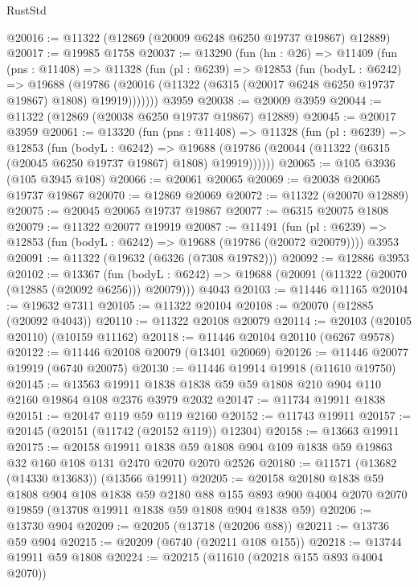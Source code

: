\begin{lexlean}{RustStd}
\begin{coremodule}
@20016 := @11322 (@12869 (@20009 @6248 @6250 @19737 @19867) @12889)
@20017 := @19985 @1758
@20037 := @13290
    (fun (hn : @26) =>
    @11409
      (fun (pns : @11408) =>
      @11328
        (fun (pl : @6239) =>
        @12853
          (fun (bodyL : @6242) =>
          @19688
            (@19786 (@20016 (@11322 (@6315 (@20017 @6248 @6250 @19737 @19867) @1808) @19919)))))))
    @3959
@20038 := @20009 @3959
@20044 := @11322 (@12869 (@20038 @6250 @19737 @19867) @12889)
@20045 := @20017 @3959
@20061 := @13320
    (fun (pns : @11408) =>
    @11328
      (fun (pl : @6239) =>
      @12853
        (fun (bodyL : @6242) =>
        @19688 (@19786 (@20044 (@11322 (@6315 (@20045 @6250 @19737 @19867) @1808) @19919))))))
@20065 := @105 @3936 (@105 @3945 @108)
@20066 := @20061 @20065
@20069 := @20038 @20065 @19737 @19867
@20070 := @12869 @20069
@20072 := @11322 (@20070 @12889)
@20075 := @20045 @20065 @19737 @19867
@20077 := @6315 @20075 @1808
@20079 := @11322 @20077 @19919
@20087 := @11491
    (fun (pl : @6239) => @12853 (fun (bodyL : @6242) => @19688 (@19786 (@20072 @20079))))
    @3953
@20091 := @11322 (@19632 (@6326 (@7308 @19782)))
@20092 := @12886 @3953
@20102 := @13367
    (fun (bodyL : @6242) => @19688 (@20091 (@11322 (@20070 (@12885 (@20092 @6256))) @20079)))
    @4043
@20103 := @11446 @11165
@20104 := @19632 @7311
@20105 := @11322 @20104
@20108 := @20070 (@12885 (@20092 @4043))
@20110 := @11322 @20108 @20079
@20114 := @20103 (@20105 @20110) (@10159 @11162)
@20118 := @11446 @20104 @20110 (@6267 @9578)
@20122 := @11446 @20108 @20079 (@13401 @20069)
@20126 := @11446 @20077 @19919 (@6740 @20075)
@20130 := @11446 @19914 @19918 (@11610 @19750)
@20145 := @13563 @19911 @1838 @1838 @59 @59 @1808 @210 @904 @110 @2160 @19864 @108 @2376 @3979 @2032
@20147 := @11734 @19911 @1838
@20151 := @20147 @119 @59 @119 @2160
@20152 := @11743 @19911
@20157 := @20145 (@20151 (@11742 (@20152 @119)) @12304)
@20158 := @13663 @19911
@20175 := @20158
    @19911
    @1838
    @59
    @1808
    @904
    @109
    @1838
    @59
    @19863
    @32
    @160
    @108
    @131
    @2470
    @2070
    @2070
    @2526
@20180 := @11571 (@13682 (@14330 @13683)) (@13566 @19911)
@20205 := @20158
    @20180
    @1838
    @59
    @1808
    @904
    @108
    @1838
    @59
    @2180
    @88
    @155
    @893
    @900
    @4004
    @2070
    @2070
    @19859
    (@13708 @19911 @1838 @59 @1808 @904 @1838 @59)
@20206 := @13730 @904
@20209 := @20205 (@13718 (@20206 @88))
@20211 := @13736 @59 @904
@20215 := @20209 (@6740 (@20211 @108 @155))
@20218 := @13744 @19911 @59 @1808
@20224 := @20215 (@11610 (@20218 @155 @893 @4004 @2070))

\end{coremodule}
\end{lexlean}
